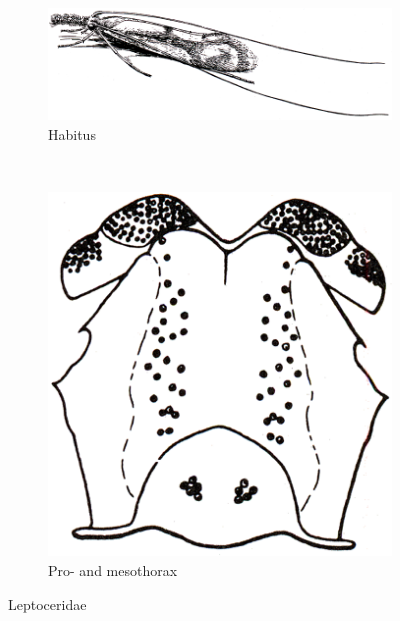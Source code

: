 \documentclass[letterpaper, 11pt]{article}
\begin{document}
\begin{figure}[ht!]
    \centering
    \begin{subfigure}[ht!]{0.6\textwidth}
        \includegraphics[width=\textwidth]{TrichoImage06}
        \caption{Habitus}
        \label{fig:lepto1}
    \end{subfigure}
    ~ %
    \begin{subfigure}[ht!]{0.2\textwidth}
        \includegraphics[width=\textwidth]{TrichoImage07}
        \caption{Pro- and mesothorax}
        \label{fig:lepto2}
    \end{subfigure}
    \caption{Leptoceridae}\label{fig:leptoc}
\end{figure}
\end{document}
